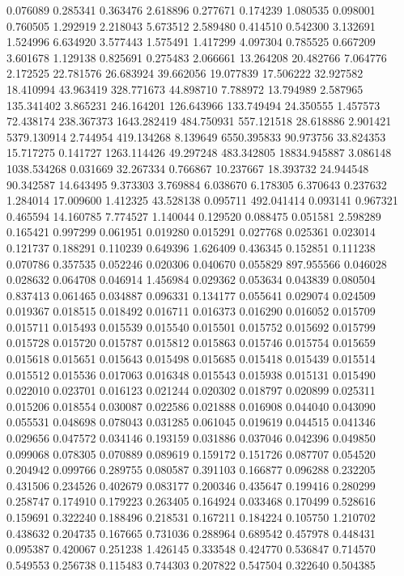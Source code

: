 0.076089
0.285341
0.363476
2.618896
0.277671
0.174239
1.080535
0.098001
0.760505
1.292919
2.218043
5.673512
2.589480
0.414510
0.542300
3.132691
1.524996
6.634920
3.577443
1.575491
1.417299
4.097304
0.785525
0.667209
3.601678
1.129138
0.825691
0.275483
2.066661
13.264208
20.482766
7.064776
2.172525
22.781576
26.683924
39.662056
19.077839
17.506222
32.927582
18.410994
43.963419
328.771673
44.898710
7.788972
13.794989
2.587965
135.341402
3.865231
246.164201
126.643966
133.749494
24.350555
1.457573
72.438174
238.367373
1643.282419
484.750931
557.121518
28.618886
2.901421
5379.130914
2.744954
419.134268
8.139649
6550.395833
90.973756
33.824353
15.717275
0.141727
1263.114426
49.297248
483.342805
18834.945887
3.086148
1038.534268
0.031669
32.267334
0.766867
10.237667
18.393732
24.944548
90.342587
14.643495
9.373303
3.769884
6.038670
6.178305
6.370643
0.237632
1.284014
17.009600
1.412325
43.528138
0.095711
492.041414
0.093141
0.967321
0.465594
14.160785
7.774527
1.140044
0.129520
0.088475
0.051581
2.598289
0.165421
0.997299
0.061951
0.019280
0.015291
0.027768
0.025361
0.023014
0.121737
0.188291
0.110239
0.649396
1.626409
0.436345
0.152851
0.111238
0.070786
0.357535
0.052246
0.020306
0.040670
0.055829
897.955566
0.046028
0.028632
0.064708
0.046914
1.456984
0.029362
0.053634
0.043839
0.080504
0.837413
0.061465
0.034887
0.096331
0.134177
0.055641
0.029074
0.024509
0.019367
0.018515
0.018492
0.016711
0.016373
0.016290
0.016052
0.015709
0.015711
0.015493
0.015539
0.015540
0.015501
0.015752
0.015692
0.015799
0.015728
0.015720
0.015787
0.015812
0.015863
0.015746
0.015754
0.015659
0.015618
0.015651
0.015643
0.015498
0.015685
0.015418
0.015439
0.015514
0.015512
0.015536
0.017063
0.016348
0.015543
0.015938
0.015131
0.015490
0.022010
0.023701
0.016123
0.021244
0.020302
0.018797
0.020899
0.025311
0.015206
0.018554
0.030087
0.022586
0.021888
0.016908
0.044040
0.043090
0.055531
0.048698
0.078043
0.031285
0.061045
0.019619
0.044515
0.041346
0.029656
0.047572
0.034146
0.193159
0.031886
0.037046
0.042396
0.049850
0.099068
0.078305
0.070889
0.089619
0.159172
0.151726
0.087707
0.054520
0.204942
0.099766
0.289755
0.080587
0.391103
0.166877
0.096288
0.232205
0.431506
0.234526
0.402679
0.083177
0.200346
0.435647
0.199416
0.280299
0.258747
0.174910
0.179223
0.263405
0.164924
0.033468
0.170499
0.528616
0.159691
0.322240
0.188496
0.218531
0.167211
0.184224
0.105750
1.210702
0.438632
0.204735
0.167665
0.731036
0.288964
0.689542
0.457978
0.448431
0.095387
0.420067
0.251238
1.426145
0.333548
0.424770
0.536847
0.714570
0.549553
0.256738
0.115483
0.744303
0.207822
0.547504
0.322640
0.504385
